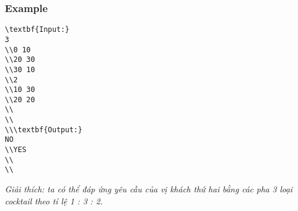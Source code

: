 \subsubsection{   Example  }
\begin{verbatim}
\textbf{Input:}
3
\\0 10
\\20 30 
\\30 10
\\2
\\10 30
\\20 20
\\
\\
\\\textbf{Output:}
NO
\\YES
\\
\\\end{verbatim}

\emph{    Giải thích: ta có thể đáp ứng yêu cầu của vị khách thứ hai bằng các pha 3 loại cocktail theo tỉ lệ 1 : 3 : 2.   }
